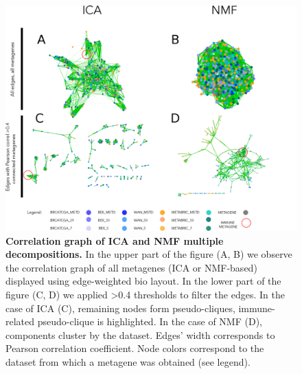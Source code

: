 \documentclass[12pt,]{book}
\theoremstyle{definition}
\theoremstyle{definition}
\theoremstyle{definition}
\theoremstyle{remark}
\begin{document}
\begin{figure}

{\centering \includegraphics[width=1\linewidth]{figures-ext/ICANMF} 

}

\caption[Correlation graph of ICA and NMF multiple decompositions]{\textbf{Correlation graph of ICA and NMF multiple
decompositions.} In the upper part of the figure (A, B) we observe the
correlation graph of all metagenes (ICA or NMF-based) displayed using
edge-weighted bio layout. In the lower part of the figure (C, D) we
applied \textgreater{}0.4 thresholds to filter the edges. In the case of
ICA (C), remaining nodes form pseudo-cliques, immune-related
pseudo-clique is highlighted. In the case of NMF (D), components cluster
by the dataset. Edges' width corresponds to Pearson correlation
coefficient. Node colors correspond to the dataset from which a metagene
was obtained (see legend).}\label{fig:icavsnmf}
\end{figure}
\end{document}
